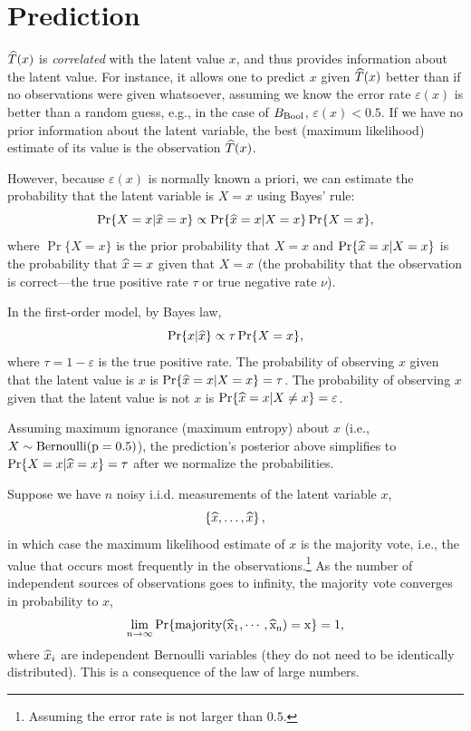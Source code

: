 \documentclass[../main.tex]{subfiles}
\begin{document}
\section{Prediction}

$\widehat{T}(x)$ is \emph{correlated} with the latent value $x$, and thus provides information about the latent value. For instance, it allows one to predict $x$ given $\widehat{T}(x)$ better than if no observations were given whatsoever, assuming we know the error rate $\varepsilon(x)$ is better than a random guess, e.g., in the case of $B_{\mathrm{Bool}}$, $\varepsilon(x) < 0.5$.
If we have no prior information about the latent variable, the best (maximum likelihood) estimate of its value is the observation $\widehat{T}(x)$.

However, because $\varepsilon(x)$ is normally known a priori, we can estimate the probability that the latent variable is $X = x$ using Bayes' rule:
\begin{equation}
\Pr\{X = x | \widehat{x} = x\} \propto \Pr\{\widehat{x} = x | X = x\} \Pr\{X = x\},
\end{equation}
where $\Pr\{X = x\}$ is the prior probability that $X = x$ and $\Pr\{\widehat{x} = x | X = x\}$ is the probability that $\widehat{x} = x$ given that $X = x$ (the probability that the observation is correct---the true positive rate $\tau$ or true negative rate $\nu$).

In the first-order model, by Bayes law,
\begin{equation}
\Pr\{x | \widehat{x}\} \propto \tau \Pr\{X = x\},
\end{equation}
where $\tau = 1 - \varepsilon$ is the true positive rate. The probability of observing $x$ given that the latent value is $x$ is $\Pr\{\widehat{x} = x | X = x\} = \tau$. The probability of observing $x$ given that the latent value is not $x$ is $\Pr\{\widehat{x} = x | X \neq x\} = \varepsilon$.

Assuming maximum ignorance (maximum entropy) about $x$ (i.e., $X \sim \rm{Bernoulli}(p=0.5)$), the prediction's posterior above simplifies to $\Pr\{X = x | \widehat{x} = x\} = \tau$ after we normalize the probabilities.

Suppose we have $n$ noisy i.i.d. measurements of the latent variable $x$,
\begin{equation}
\left\{ \widehat{x}, \ldots, \widehat{x} \right\},
\end{equation}
in which case the maximum likelihood estimate of $x$ is the majority vote, i.e., the value that occurs most frequently in the observations.\footnote{Assuming the error rate is not larger than $0.5$.} As the number of independent sources of observations goes to infinity, the majority vote converges in probability to $x$,
\begin{equation}
\lim_{n \to \infty} \Pr\{\rm{majority}(\widehat{x}_1,\cdots,\widehat{x}_n ) = x\} = 1,
\end{equation}
where $\widehat{x}_i$ are independent Bernoulli variables (they do not need to be identically distributed). This is a consequence of the law of large numbers.
\end{document}
